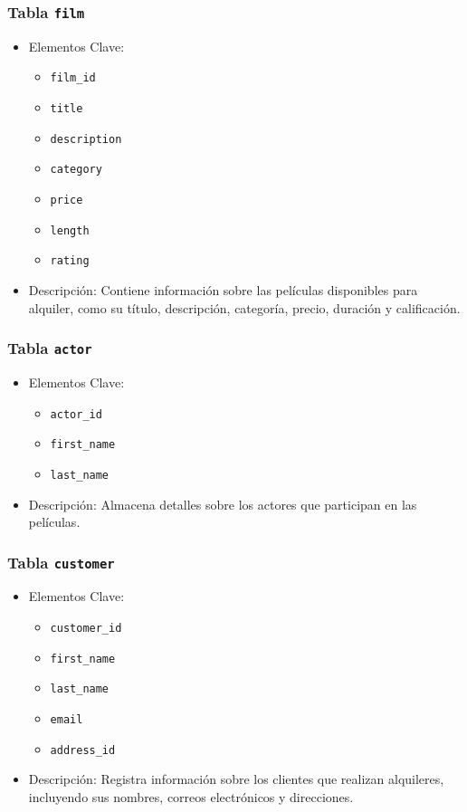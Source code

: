 \documentclass[10pt]{report}
\begin{document}
		\subsubsection{Tabla \texttt{film}}
		\begin{itemize}
		  \item Elementos Clave:
		  \begin{itemize}
			\item \texttt{film\_id}
			\item \texttt{title}
			\item \texttt{description}
			\item \texttt{category}
			\item \texttt{price}
			\item \texttt{length}
			\item \texttt{rating}
		  \end{itemize}
		  \item Descripción: Contiene información sobre las películas disponibles para alquiler, como su título, descripción, categoría, precio, duración y calificación.
		\end{itemize}
		
		\subsubsection{Tabla \texttt{actor}}
		\begin{itemize}
		  \item Elementos Clave:
		  \begin{itemize}
			\item \texttt{actor\_id}
			\item \texttt{first\_name}
			\item \texttt{last\_name}
		  \end{itemize}
		  \item Descripción: Almacena detalles sobre los actores que participan en las películas.
		\end{itemize}

		\subsubsection{Tabla \texttt{customer}}
		\begin{itemize}
		  \item Elementos Clave:
		  \begin{itemize}
			\item \texttt{customer\_id}
			\item \texttt{first\_name}
			\item \texttt{last\_name}
			\item \texttt{email}
			\item \texttt{address\_id}
		  \end{itemize}
		  \item Descripción: Registra información sobre los clientes que realizan alquileres, incluyendo sus nombres, correos electrónicos y direcciones.
		\end{itemize}
		
\end{document}
